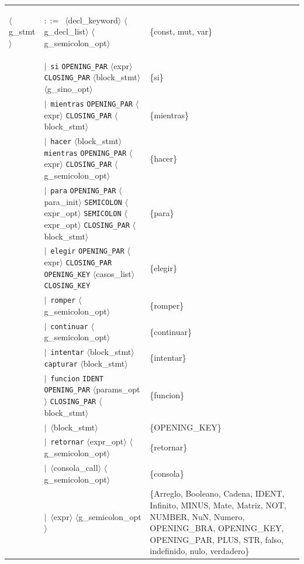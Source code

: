 \documentclass[10pt]{article}
\begin{document}
{\begin{longtable}{@{} p{2.0cm} p{6.9cm} p{6.9cm} @{}}
  \midrule
  \textcolor{ntcolor}{\parbox[t]{1.8cm}{\raggedright$\langle$g\_\allowbreak{}stmt$\rangle$}} & $::=$~$\langle$decl\_keyword$\rangle$ $\langle$g\_decl\_list$\rangle$ $\langle$g\_semicolon\_opt$\rangle$ & \{const, mut, var\} \\
   & $\mid$~\texttt{si} \texttt{OPENING\_PAR} $\langle$expr$\rangle$ \texttt{CLOSING\_PAR} $\langle$block\_stmt$\rangle$ $\langle$g\_sino\_opt$\rangle$ & \{si\} \\
   & $\mid$~\texttt{mientras} \texttt{OPENING\_PAR} $\langle$expr$\rangle$ \texttt{CLOSING\_PAR} $\langle$block\_stmt$\rangle$ & \{mientras\} \\
   & $\mid$~\texttt{hacer} $\langle$block\_stmt$\rangle$ \texttt{mientras} \texttt{OPENING\_PAR} $\langle$expr$\rangle$ \texttt{CLOSING\_PAR} $\langle$g\_semicolon\_opt$\rangle$ & \{hacer\} \\
   & $\mid$~\texttt{para} \texttt{OPENING\_PAR} $\langle$para\_init$\rangle$ \texttt{SEMICOLON} $\langle$expr\_opt$\rangle$ \texttt{SEMICOLON} $\langle$expr\_opt$\rangle$ \texttt{CLOSING\_PAR} $\langle$block\_stmt$\rangle$ & \{para\} \\
   & $\mid$~\texttt{elegir} \texttt{OPENING\_PAR} $\langle$expr$\rangle$ \texttt{CLOSING\_PAR} \texttt{OPENING\_KEY} $\langle$casos\_list$\rangle$ \texttt{CLOSING\_KEY} & \{elegir\} \\
   & $\mid$~\texttt{romper} $\langle$g\_semicolon\_opt$\rangle$ & \{romper\} \\
   & $\mid$~\texttt{continuar} $\langle$g\_semicolon\_opt$\rangle$ & \{continuar\} \\
   & $\mid$~\texttt{intentar} $\langle$block\_stmt$\rangle$ \texttt{capturar} $\langle$block\_stmt$\rangle$ & \{intentar\} \\
   & $\mid$~\texttt{funcion} \texttt{IDENT} \texttt{OPENING\_PAR} $\langle$params\_opt$\rangle$ \texttt{CLOSING\_PAR} $\langle$block\_stmt$\rangle$ & \{funcion\} \\
   & $\mid$~$\langle$block\_stmt$\rangle$ & \{OPENING\_KEY\} \\
   & $\mid$~\texttt{retornar} $\langle$expr\_opt$\rangle$ $\langle$g\_semicolon\_opt$\rangle$ & \{retornar\} \\
   & $\mid$~$\langle$consola\_call$\rangle$ $\langle$g\_semicolon\_opt$\rangle$ & \{consola\} \\
   & $\mid$~$\langle$expr$\rangle$ $\langle$g\_semicolon\_opt$\rangle$ & \{Arreglo, Booleano, Cadena, IDENT, Infinito, MINUS, Mate, Matriz, NOT, NUMBER, NuN, Numero, OPENING\_BRA, OPENING\_KEY, OPENING\_PAR, PLUS, STR, falso, indefinido, nulo, verdadero\} \\

\end{longtable}}
\end{document}
